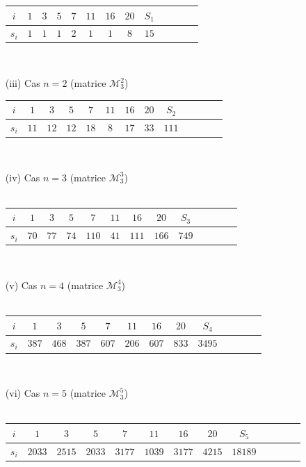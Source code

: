 \begin{itemize}
\begin{tabular}{|c|c|c|c|c|c|c|c|c|c|c|c|c|}
 \hline
 $i$ & $1$ & $3$ & $5$ & $7$ & $11$ & $16$ & $20$&$S_{1}$\\
 \hline
 $s_{i}$ & $1$ & $1$ & $1$ & $2$ & $1$&$1$&$8$&$15$\\
 \hline
 \end{tabular}
 \mbox{ }\\
\item[(iii)] Cas $n=2$ (matrice $\mathcal{M}_{3}^{2}$)\\
\begin{tabular}{|c|c|c|c|c|c|c|c|c|c|c|c|c|}
 \hline
 $i$ & $1$ & $3$ & $5$ & $7$ & $11$ & $16$ & $20$&$S_{2}$\\
 \hline
 $s_{i}$ & $11$ & $12$ & $12$ & $18$ & $8$&$17$&$33$&$111$\\
 \hline
 \end{tabular}
 \mbox{ }\\
\item[(iv)] Cas $n=3$ (matrice $\mathcal{M}_{3}^{3}$)\\
\mbox{}\\
\begin{tabular}{|c|c|c|c|c|c|c|c|c|c|c|c|c|}
 \hline
 $i$ & $1$ & $3$ & $5$ & $7$ & $11$ & $16$ & $20$&$S_{3}$\\
 \hline
 $s_{i}$ & $70$ & $77$ & $74$ & $110$ & $41$&$111$&$166$&$749$\\
 \hline
 \end{tabular}
 \mbox{ }\\
\item[(v)] Cas $n=4$ (matrice $\mathcal{M}_{3}^{4}$)\\
\mbox{}\\
\begin{tabular}{|c|c|c|c|c|c|c|c|c|c|c|c|c|}
 \hline
 $i$ & $1$ & $3$ & $5$ & $7$ & $11$ & $16$ & $20$&$S_{4}$\\
 \hline
 $s_{i}$ & $387$ & $468$ & $387$ & $607$ & $206$&$607$&$833$&$3495$\\
 \hline
 \end{tabular}
 \mbox{ }\\
\item[(vi)] Cas $n=5$ (matrice $\mathcal{M}_{3}^{5}$)\\
\mbox{}\\
\begin{tabular}{|c|c|c|c|c|c|c|c|c|c|c|c|c|}
 \hline
 $i$ & $1$ & $3$ & $5$ & $7$ & $11$ & $16$ & $20$&$S_{5}$\\
 \hline
 $s_{i}$ & $2033$ & $2515$ & $2033$ & $3177$ & $1039$&$3177$&$4215$&$18189$\\

\end{tabular}
\end{itemize}
